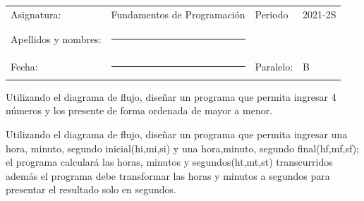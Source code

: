 \documentclass[12pt]{exam}
\begin{document}
\begin{table}[H]
  \centering
  \begin{tabular}[H]{llll}
    Asignatura: & Fundamentos de Programación & Periodo & 2021-2S\\
              &                     &            & \\     
    Apellidos y nombres: &\rule{7cm}{0.4pt}    &  & \\
              &                     &            & \\
    Fecha: &\rule{5cm}{0.4pt}   & Paralelo: & {\Large B} \\
  \end{tabular}
\end{table}




\begin{questions}

\question[25] Utilizando el diagrama de flujo, diseñar un programa que permita ingresar 4 números y los presente de forma ordenada de mayor a menor. 

  \begin{center}
  
  \end{center}

\newpage
\question[25] Utilizando el diagrama de flujo, diseñar un programa  que permita ingresar una hora, minuto, segundo inicial(hi,mi,si) y una hora,minuto, segundo final(hf,mf,sf); el programa calculará las horas, minutos y segundos(ht,mt,st) transcurridos además el programa debe transformar las horas y minutos  a segundos para presentar el resultado solo en segundos. 




\end{questions}
\end{document}

